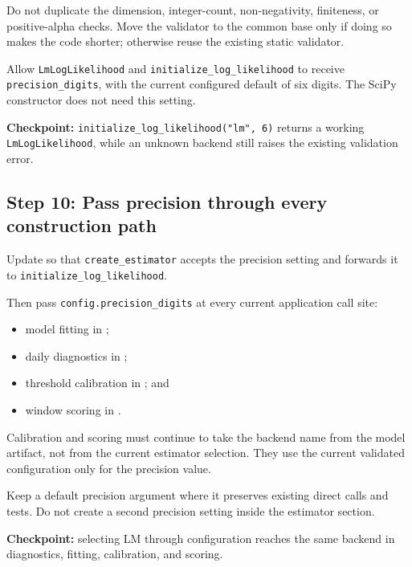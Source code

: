 \documentclass[11pt,a4paper]{article}
\begin{document}
Do not duplicate the dimension, integer-count, non-negativity, finiteness, or
positive-alpha checks. Move the validator to the common base only if doing so
makes the code shorter; otherwise reuse the existing static validator.

Allow \texttt{LmLogLikelihood} and \texttt{initialize\_log\_likelihood} to
receive \texttt{precision\_digits}, with the current configured default of six
digits. The SciPy constructor does not need this setting.

\textbf{Checkpoint:} \texttt{initialize\_log\_likelihood("lm", 6)} returns a
working \texttt{LmLogLikelihood}, while an unknown backend still raises the
existing validation error.

\subsection{Step 10: Pass precision through every construction path}

Update  so that
\texttt{create\_estimator} accepts the precision setting and forwards it to
\texttt{initialize\_log\_likelihood}.

Then pass \texttt{config.precision\_digits} at every current application call
site:

\begin{itemize}

\item model fitting in ;

\item daily diagnostics in ;

\item threshold calibration in
; and

\item window scoring in .

\end{itemize}

Calibration and scoring must continue to take the backend name from the model
artifact, not from the current estimator selection. They use the current
validated configuration only for the precision value.

Keep a default precision argument where it preserves existing direct calls and
tests. Do not create a second precision setting inside the estimator section.

\textbf{Checkpoint:} selecting LM through configuration reaches the same
backend in diagnostics, fitting, calibration, and scoring.
\end{document}
